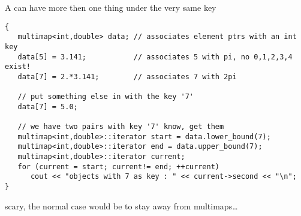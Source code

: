 A  can have more then one thing under the very same key\\
\begin{boxedminipage}{\linewidth}
\begin{verbatim}
{
   multimap<int,double> data; // associates element ptrs with an int key
   data[5] = 3.141;           // associates 5 with pi, no 0,1,2,3,4 exist!
   data[7] = 2.*3.141;        // associates 7 with 2pi

   // put something else in with the key '7'
   data[7] = 5.0;

   // we have two pairs with key '7' know, get them
   multimap<int,double>::iterator start = data.lower_bound(7);
   multimap<int,double>::iterator end = data.upper_bound(7);
   multimap<int,double>::iterator current;
   for (current = start; current!= end; ++current)
      cout << "objects with 7 as key : " << current->second << "\n";
}
\end{verbatim}
\end{boxedminipage}
scary, the normal case would be to stay away from multimaps\ldots
